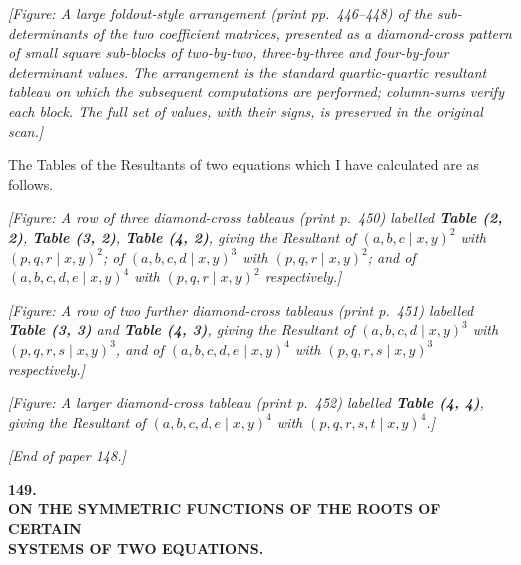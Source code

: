 \documentclass[11pt]{article}
\begin{document}
\medskip

\noindent\textit{[Figure: A large foldout-style arrangement (print pp.~446--448) of the sub-determinants of the two coefficient matrices, presented as a diamond-cross pattern of small square sub-blocks of two-by-two, three-by-three and four-by-four determinant values. The arrangement is the standard quartic-quartic resultant tableau on which the subsequent computations are performed; column-sums verify each block. The full set of values, with their signs, is preserved in the original scan.]}

\medskip

\noindent The Tables of the Resultants of two equations which I have calculated are as follows.

\medskip

\noindent\textit{[Figure: A row of three diamond-cross tableaus (print p.~450) labelled \textbf{Table (2, 2)}, \textbf{Table (3, 2)}, \textbf{Table (4, 2)}, giving the Resultant of $(a, b, c \mid x, y)^2$ with $(p, q, r \mid x, y)^2$; of $(a, b, c, d \mid x, y)^3$ with $(p, q, r \mid x, y)^2$; and of $(a, b, c, d, e \mid x, y)^4$ with $(p, q, r \mid x, y)^2$ respectively.]}

\medskip

\noindent\textit{[Figure: A row of two further diamond-cross tableaus (print p.~451) labelled \textbf{Table (3, 3)} and \textbf{Table (4, 3)}, giving the Resultant of $(a, b, c, d \mid x, y)^3$ with $(p, q, r, s \mid x, y)^3$, and of $(a, b, c, d, e \mid x, y)^4$ with $(p, q, r, s \mid x, y)^3$ respectively.]}

\medskip

\noindent\textit{[Figure: A larger diamond-cross tableau (print p.~452) labelled \textbf{Table (4, 4)}, giving the Resultant of $(a, b, c, d, e \mid x, y)^4$ with $(p, q, r, s, t \mid x, y)^4$.]}

\medskip

\noindent\textit{[End of paper 148.]}

\begin{center}
{\Large\bfseries 149.}\\[1ex]
{\large\bfseries ON THE SYMMETRIC FUNCTIONS OF THE ROOTS OF CERTAIN}\\
{\large\bfseries SYSTEMS OF TWO EQUATIONS.}
\end{center}
\end{document}
